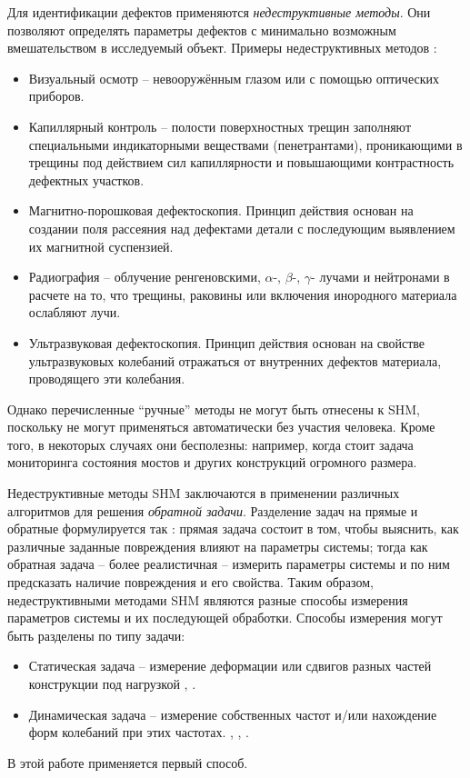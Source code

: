 \documentclass[a4paper,12pt]{article}
\theoremstyle{remark}
\begin{document}
	Для идентификации дефектов применяются \textit{недеструктивные методы}. Они позволяют определять параметры дефектов с минимально возможным вмешательством в исследуемый объект. Примеры недеструктивных методов \cite{damage_identification_beam_crossectional_area}:
	\begin{itemize}[itemsep=0cm, topsep=0.2cm]
		\item Визуальный осмотр -- невооружённым глазом или с помощью оптических приборов.
		\item Капиллярный контроль -- полости поверхностных трещин заполняют специальными индикаторными веществами (пенетрантами), проникающими в трещины под действием сил капиллярности и повышающими контрастность дефектных участков.
		\item Магнитно-порошковая дефектоскопия. Принцип действия основан на создании поля рассеяния над дефектами детали с последующим выявлением их магнитной суспензией.
		\item Радиография -- облучение ренгеновскими, $\alpha$-, $\beta$-,  $\gamma$- лучами и нейтронами в расчете на то, что трещины, раковины или включения инородного материала ослабляют лучи.
		\item Ультразвуковая дефектоскопия. Принцип действия основан на свойстве ультразвуковых колебаний отражаться от внутренних дефектов материала, проводящего эти колебания.
	\end{itemize}
	Однако перечисленные ``ручные'' методы не могут быть отнесены к SHM, поскольку не могут применяться автоматически без участия человека. Кроме того, в некоторых случаях они бесполезны: например, когда стоит задача мониторинга состояния мостов и других конструкций огромного размера.
	
	Недеструктивные методы SHM заключаются в применении различных алгоритмов для решения \textit{обратной задачи}. Разделение задач на прямые и обратные формулируется так \cite{crack_detection}: прямая задача состоит в том, чтобы выяснить, как различные заданные повреждения влияют на параметры системы; тогда как обратная задача -- более реалистичная -- измерить параметры системы и по ним предсказать наличие повреждения и его свойства. Таким образом, недеструктивными методами SHM являются разные способы измерения параметров системы и их последующей обработки. Способы измерения могут быть разделены по типу задачи:
	\begin{itemize}[itemsep=0cm, topsep=0.2cm]
		\item Статическая задача -- измерение деформации или сдвигов разных частей конструкции под нагрузкой \cite{artificial_neural_networks_in_damage_detection}, \cite{randomized_trained_neural_networks}.
		\item Динамическая задача -- измерение собственных частот и/или нахождение форм колебаний при этих частотах. \cite{damage_identification_beam_crossectional_area}, \cite{crack_detection}, \cite{multi_stage_neural_networks}.
	\end{itemize}
	В этой работе применяется первый способ.
	
\end{document}
